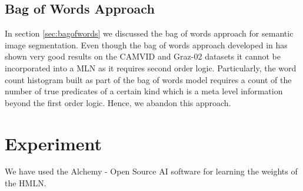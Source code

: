 \documentclass{article} %
\begin{document}
\subsection{Bag of Words Approach}
\label{sec:BofWordApp}

In section \ref{sec:bagofwords} we discussed the bag of words approach for semantic image segmentation. Even though the bag of words approach developed in \cite{visualdictrene} has shown very good results on the CAMVID and Graz-02 \cite{graz02} datasets it cannot be incorporated into a MLN as it requires second order logic. Particularly, the word count histogram built as part of the bag of words model requires a count of the number of true predicates of a certain kind which is a meta level information beyond the first order logic. Hence, we abandon this approach.

\section{Experiment}
\label{sec:Exp}

We have used the Alchemy - Open Source AI software \cite{alchemy} for learning the weights of the HMLN.
\end{document}
